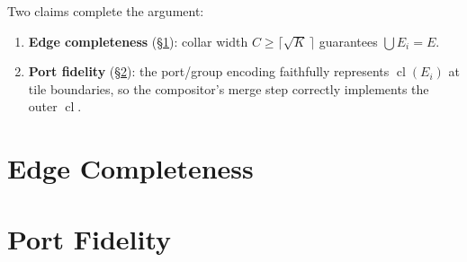 \documentclass[11pt]{article}
\begin{document}
\medskip\noindent
Two claims complete the argument:

\begin{enumerate}
    \item \textbf{Edge completeness} (\S\ref{sec:edge-completeness}):
          collar width $C \ge \lceil\sqrt{K}\,\rceil$ guarantees
          $\bigcup E_i = E$.
    \item \textbf{Port fidelity} (\S\ref{sec:port-fidelity}):
          the port/group encoding faithfully represents
          $\operatorname{cl}(E_i)$ at tile boundaries, so the
          compositor's merge step correctly implements the outer
          $\operatorname{cl}$.
\end{enumerate}

\section{Edge Completeness}
\label{sec:edge-completeness}


\section{Port Fidelity}
\label{sec:port-fidelity}

\end{document}

